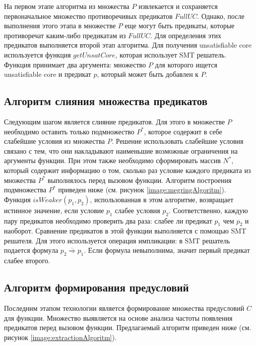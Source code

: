 На первом этапе алгоритма из множества $P$ извлекается и сохраняется первоначальное множество противоречивых предикатов $FullUC$. Однако, после выполнения этого этапа в множестве $P$ еще могут быть предикаты, которые противоречат каким-либо предикатам из $FullUC$. Для определения этих предикатов выполняется второй этап алгоритма. Для получения unsatisfiable core используется функция $getUnsatCore$, которая использует SMT решатель. Функция принимает два аргумента: множество $P$ для которого ищется unsatisfiable core и предикат $p$, который может быть добавлен к $P$.

\subsection{Алгоритм слияния множества предикатов}
Следующим шагом является слияние предикатов. Для этого в множестве $P$ необходимо оставить только подмножество $P^*$, которое содержит в себе слабейшие условия из множества $P$. Решение использовать слабейшие условия связано с тем, что они накладывают наименьшие возможные ограничения на аргументы функции. При этом также необходимо сформировать массив $N^*$, который содержит информацию о том, сколько раз условие каждого предиката из множества $P^*$ выполнялось перед вызовом функции. Алгоритм построения подмножества $P^*$ приведен ниже (см. рисунок \ref{image:megringAlgoritm}). Функция $isWeaker(p_1, p_2)$, использованная в этом алгоритме, возвращает истинное значение, если условие $p_1$ слабее условия $p_2$. Соответственно, каждую пару предикатов необходимо проверить два раза: слабее ли предикат $p_1$ чем $p_2$ и наоборот. Сравнение предикатов в этой функции выполняется с помощью SMT решателя. Для этого исполь­зуется операция импликации: в SMT решатель подается форму­ла $\overline{p_2 \Longrightarrow p_1}$. Если формула невыполнима, значит первый предикат слабее второго.

\subsection{Алгоритм формирования предусловий}
Последним этапом технологии является формирование множества предусловий $C$ для функции. Множество выявляется на основе анализа частоты появления предикатов перед вызовом функции. Предлагаемый
алгоритм приведен ниже (см. рисунок \ref{image:extractionAlgoritm}).

